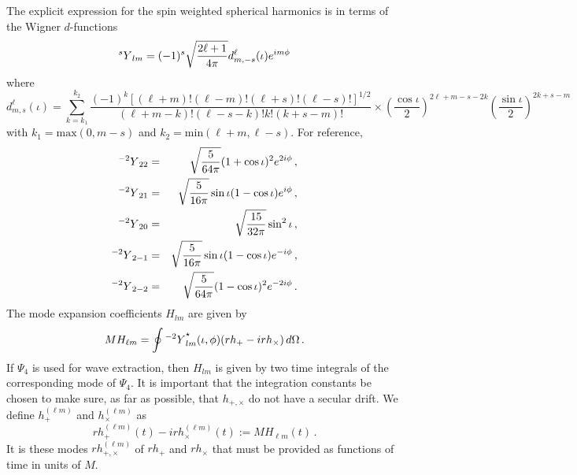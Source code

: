 \documentclass[10pt]{ligodcc}
\begin{document}
The explicit expression for the spin weighted spherical harmonics is
in terms of the Wigner $d$-functions
\begin{equation}
  \label{eq:5}
   {{}^sY}_{lm} = (-1)^s\sqrt{\frac{2\ell+1}{4\pi}} d^\ell_{m,-s}(\iota)e^{im\phi}
\end{equation}
where
\begin{equation}
  \label{eq:6}
  d^\ell_{m,s}(\iota) = \sum_{k = k_1}^{k_2}
    \frac{(-1)^k[(\ell+m)!(\ell-m)!(\ell+s)!(\ell-s)!]^{1/2}}{(\ell +m
      -k)!(\ell-s-k)!k!(k+s-m)!}  
    \times \left(\frac{\cos\iota}{2}\right)^{2\ell+m-s-2k}\left(\frac{\sin\iota}{2}\right)^{2k+s-m}  
\end{equation}
with $k_1 = \textrm{max}(0, m-s)$ and $k_2=\textrm{min}(\ell+m,
\ell-s)$.  For reference,
\begin{eqnarray}
  \label{eq:7}
  {{}^{-2}Y}_{22} &=& \sqrt{\frac{5}{64\pi}}(1+\cos\iota)^2e^{2i\phi} \,,\\
  {{}^{-2}Y}_{21} &=& \sqrt{\frac{5}{16\pi}}  \sin\iota( 1 - \cos\iota )e^{i\phi} \,,\\
  {{}^{-2}Y}_{20} &=& \sqrt{\frac{15}{32\pi}} \sin^2\iota \,,\\
  {{}^{-2}Y}_{2-1} &=& \sqrt{\frac{5}{16\pi}}  \sin\iota( 1 - \cos\iota
  )e^{-i\phi} \,,\\
  {{}^{-2}Y}_{2-2} &=& \sqrt{\frac{5}{64\pi}}(1-\cos\iota)^2e^{-2i\phi}\,.
\end{eqnarray}
The mode expansion coefficients $H_{lm}$ are given by
\begin{equation}
  \label{eq:10}
  MH_{\ell m} = \oint {{}^{-2}Y}_{lm}^\star(\iota,\phi)(rh_+-irh_\times )\,d\Omega\,.
\end{equation}
If $\Psi_4$ is used for wave extraction, then $H_{lm}$ is given by two
time integrals of the corresponding mode of $\Psi_4$.  It is important
that the integration constants be chosen to make sure, as far as
possible, that $h_{+,\times}$ do not have a secular drift. 
We define $h_+^{(\ell m)}$ and $h_\times^{(\ell m)}$ as
\begin{equation}
  \label{eq:11}
  rh_+^{(\ell m)}(t) -irh_\times^{(\ell m)}(t) := MH_{\ell m}(t)\,.  
\end{equation}
It is these modes $rh_{+,\times}^{(\ell m)}$ of $rh_+$ and $rh_\times$ that must be
provided as functions of time in units of $M$.
\end{document}
